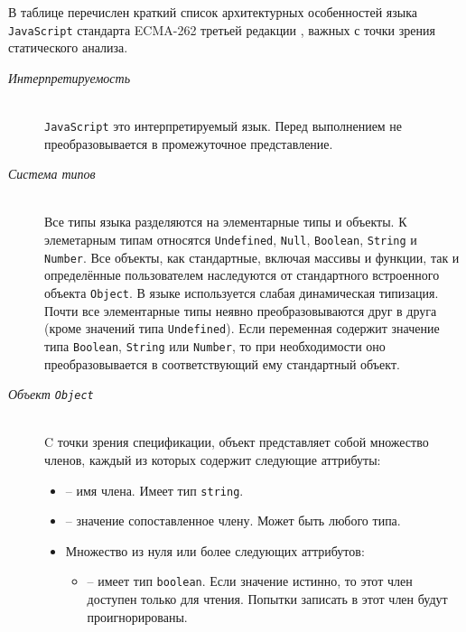 \label{sec:features}
В таблице перечислен краткий список архитектурных
особенностей языка \texttt{JavaScript} стандарта ECMA-262 третьей
редакции \cite{specification1999standard}, важных с точки зрения
статического анализа. 

\begin{description}
    \item[\emph{Интерпретируемость}]~\\  %
 \texttt{JavaScript} это интерпретируемый язык. Перед выполнением не
    преобразовывается в промежуточное представление.
    
    \item[\emph{Система типов}]~\\  %
    Все типы языка разделяются на элементарные типы и объекты. К
    элеметарным типам относятся \texttt{Undefined}, \texttt{Null},
    \texttt{Boolean}, \texttt{String} и \texttt{Number}. Все объекты,
    как стандартные, включая массивы и функции, так и определённые
    пользователем наследуются от стандартного встроенного объекта
    \texttt{Object}.
    В языке используется слабая динамическая типизация. Почти все
    элементарные типы неявно преобразовываются друг в друга (кроме
    значений типа \texttt{Undefined}). Если переменная содержит
    значение типа \texttt{Boolean}, \texttt{String} или
    \texttt{Number}, то при необходимости оно преобразовывается в
    соответствующий ему стандартный объект.
    \item[\emph{Объект \texttt{Object}}]~\\  %
    C точки зрения спецификации, объект представляет собой множество
    членов, каждый из которых содержит следующие аттрибуты:
    \begin{itemize}
      \item {} -- имя члена. Имеет тип \texttt{string}.

      \item {} -- значение сопоставленное члену. Может быть
	любого типа.

      \item Множество из нуля или более следующих аттрибутов:
	\begin{itemize}
	  \item {} -- имеет тип \texttt{boolean}. Если
	    значение истинно, то этот член доступен только для
	    чтения. Попытки записать в этот член будут проигнорированы.


\end{itemize}
\end{itemize}
\end{description}
